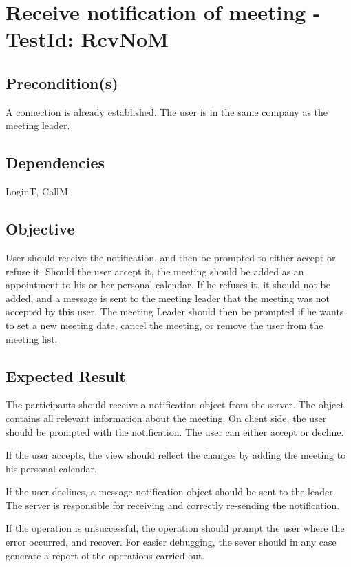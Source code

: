 \documentclass{article}
\begin{document}
\section{Receive notification of meeting - TestId: RcvNoM}

\subsection{Precondition(s)}

A connection is already established. The user is in the same company as the
meeting leader.

\subsection{Dependencies}

LoginT, CallM

\subsection{Objective}

User should receive the notification, and then be prompted to either accept
or refuse it. Should the user accept it, the meeting should be added as an
appointment to his or her personal calendar. If he refuses it, it should not
be added, and a message is sent to the meeting leader that the meeting was
not accepted by this user. The meeting Leader should then be prompted if he
wants to set a new meeting date, cancel the meeting, or remove the user from
the meeting list.

\subsection{Expected Result}

The participants should receive a notification object from the server. The
object contains all relevant information about the meeting. On client side,
the user should be prompted with the notification. The user can either
accept or decline.

If the user accepts, the view should reflect the changes by adding the
meeting to his personal calendar.

If the user declines, a message notification object should be sent to the
leader. The server is responsible for receiving and correctly re-sending the
notification.

If the operation is unsuccessful, the operation should prompt the user where
the error occurred, and recover. For easier debugging, the sever should in
any case generate a report of the operations carried out. \newpage
\end{document}
